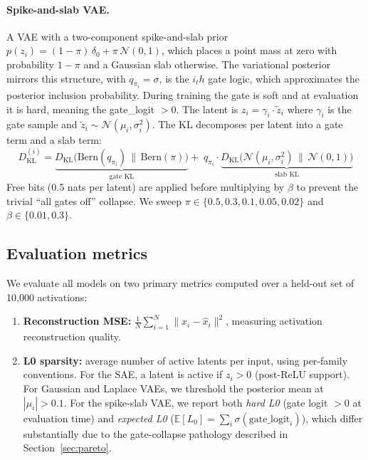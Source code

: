 \documentclass{article}
\begin{document}
\paragraph{Spike-and-slab VAE.}
A VAE with a two-component spike-and-slab prior $p(z_i) = (1-\pi)\,\delta_0 + \pi\,\mathcal{N}(0,1)$, which places a point mass at zero with probability $1-\pi$ and a Gaussian slab otherwise. The variational posterior mirrors this structure, with $q_{\pi_i} = \sigma$, is the $i_th$ gate logic, which approximates the posterior inclusion probability. During training the gate is soft and at evaluation it is hard, meaning the gate\_logit $> 0$. The latent is $z_i = \gamma_i \cdot \tilde{z}_i$ where $\gamma_i$ is the gate sample and $\tilde{z}_i \sim \mathcal{N}(\mu_i, \sigma_i^2)$. The KL decomposes per latent into a gate term and a slab term:
\begin{equation}
D_\text{KL}^{(i)} = \underbrace{D_\text{KL}\!\bigl(\text{Bern}(q_{\pi_i})\,\|\,\text{Bern}(\pi)\bigr)}_{\text{gate KL}}
  + \; q_{\pi_i} \cdot \underbrace{D_\text{KL}\!\bigl(\mathcal{N}(\mu_i,\sigma_i^2)\,\|\,\mathcal{N}(0,1)\bigr)}_{\text{slab KL}}
\label{eq:spikeslab_kl}
\end{equation}
Free bits (0.5 nats per latent) are applied before multiplying by $\beta$ to prevent the trivial ``all gates off'' collapse. We sweep $\pi \in \{0.5, 0.3, 0.1, 0.05, 0.02\}$ and $\beta \in \{0.01, 0.3\}$.

\subsection{Evaluation metrics}

We evaluate all models on two primary metrics computed over a held-out set of 10{,}000 activations:

\begin{enumerate}
\item \textbf{Reconstruction MSE:} $\frac{1}{N}\sum_{i=1}^N \|x_i - \hat{x}_i\|^2$, measuring activation reconstruction quality.
\item \textbf{L0 sparsity:} average number of active latents per input, using per-family conventions. For the SAE, a latent is active if $z_i > 0$ (post-ReLU support). For Gaussian and Laplace VAEs, we threshold the posterior mean at $|\mu_i| > 0.1$. For the spike-slab VAE, we report both \emph{hard L0} (gate logit $> 0$ at evaluation time) and \emph{expected L0} ($\mathbb{E}[L_0] = \sum_i \sigma(\text{gate\_logit}_i)$), which differ substantially due to the gate-collapse pathology described in Section~\ref{sec:pareto}.
\end{enumerate}
\end{document}

